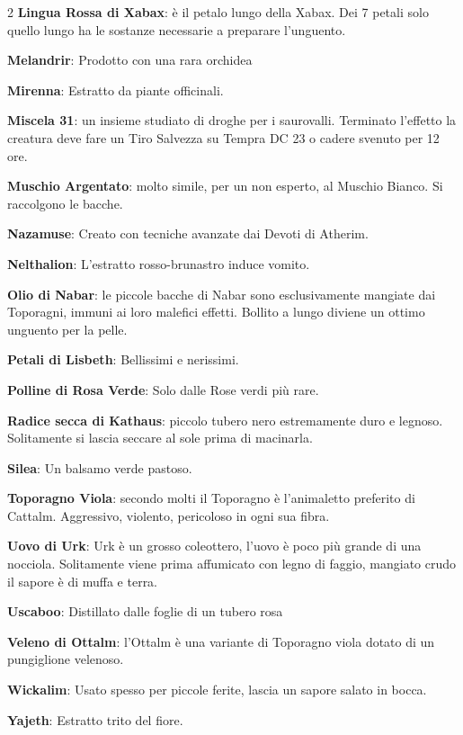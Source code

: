 \begin{multicols}{2}
\textbf{Lingua Rossa di Xabax}: è il petalo lungo della Xabax. Dei 7 petali solo quello lungo ha le sostanze necessarie a preparare l'unguento.

\textbf{Melandrir}: Prodotto con una rara orchidea

\textbf{Mirenna}: Estratto da piante officinali.

\textbf{Miscela 31}: un insieme studiato di droghe per i saurovalli. Terminato l'effetto la creatura deve fare un Tiro Salvezza su Tempra DC 23 o cadere svenuto per 12 ore.

\textbf{Muschio Argentato}: molto simile, per un non esperto, al Muschio Bianco. Si raccolgono le bacche.

\textbf{Nazamuse}: Creato con tecniche avanzate dai Devoti di Atherim.

\textbf{Nelthalion}: L'estratto rosso-brunastro induce vomito.

\textbf{Olio di Nabar}: le piccole bacche di Nabar sono esclusivamente mangiate dai Toporagni, immuni ai loro malefici effetti. Bollito a lungo diviene un ottimo unguento per la pelle.

\textbf{Petali di Lisbeth}: Bellissimi e nerissimi.

\textbf{Polline di Rosa Verde}: Solo dalle Rose verdi più rare.

\textbf{Radice secca di Kathaus}: piccolo tubero nero estremamente duro e legnoso. Solitamente si lascia seccare al sole prima di macinarla.


\textbf{Silea}: Un balsamo verde pastoso.

\textbf{Toporagno Viola}: secondo molti il Toporagno è l'animaletto preferito di Cattalm. Aggressivo, violento, pericoloso in ogni sua fibra.

\textbf{Uovo di Urk}: Urk è un grosso coleottero, l'uovo è poco più grande di una nocciola. Solitamente viene prima affumicato con legno di faggio, mangiato crudo il sapore è di muffa e terra.

\textbf{Uscaboo}: Distillato dalle foglie di un tubero rosa

\textbf{Veleno di Ottalm}: l'Ottalm è una variante di Toporagno viola dotato di un pungiglione velenoso.

\textbf{Wickalim}: Usato spesso per piccole ferite, lascia un sapore salato in bocca.

\textbf{Yajeth}: Estratto trito del fiore.


\end{multicols}
